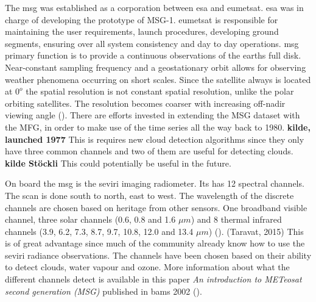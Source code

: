 The \acrfull{msg} was established as a corporation between \acrfull{esa} and \acrfull{eumetsat}. \acrshort{esa} was in charge of developing the prototype of MSG-1. \acrshort{eumetsat} is responsible for maintaining the user requirements, launch procedures, developing ground segments, ensuring over all system consistency and day to day operations.  \acrshort{msg} primary function is to provide a continuous observations of the earths full disk. Near-constant sampling frequency and a geostationary orbit allows for observing weather phenomena occurring on short scales. Since the satellite always is located at $0^o$ the spatial resolution is not constant spatial resolution, unlike the polar orbiting satellites. The resolution becomes coarser with increasing off-nadir viewing angle (\cite{Stubenrauch2013AssessmentPanel}). There are efforts invested in extending the MSG dataset with the MFG, in order to make use of the time series all the way back to 1980. \textbf{kilde, launched 1977} This is requires new cloud detection algorithms since they only have three common channels and two of them are useful for detecting clouds. \textbf{kilde Stöckli} This could potentially be useful in the future. 

On board the \acrshort{msg} is the \acrfull{seviri} imaging radiometer. Its has  12 spectral channels. The scan is done south to north, east to west. The wavelength of the discrete channels are chosen based on heritage from other sensors. One broadband visible channel, three solar channels (0.6, 0.8 and 1.6 $\mu m$) and 8 thermal infrared channels (3.9, 6.2, 7.3, 8.7, 9.7, 10.8, 12.0 and 13.4 $\mu m$) (\cite{Taravat2015MultilayerMasking}). (Taravat, 2015)  This is of great advantage since much of the community already know how to use the \acrshort{seviri} radiance observations. The channels have been chosen based on their ability to detect clouds, water vapour and ozone. More information about what the different channels detect is available in this paper \textit{An introduction to METeosat second generation (MSG)} published in \acrshort{bams} 2002 (\cite{Schmetz_meteosat_intro}).

